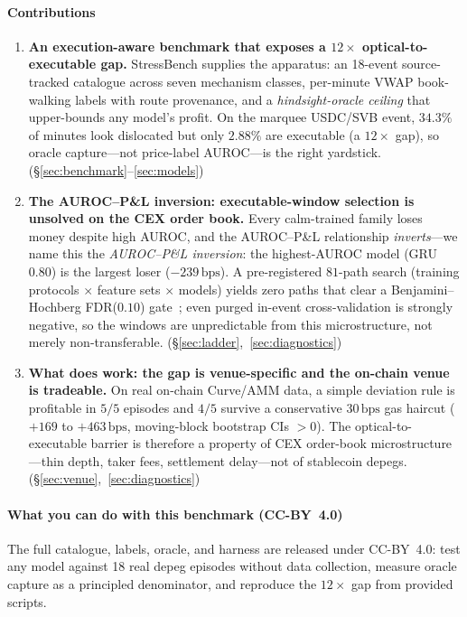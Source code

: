 \documentclass[sigconf,anonymous,natbib=false]{acmart}
\newcommand{\bps}{\,\text{bps}}
\begin{document}
\paragraph{Contributions}
\begin{enumerate}[leftmargin=*,itemsep=2pt,topsep=2pt]
  \item \textbf{An execution-aware benchmark that exposes a $12\times$ optical-to-executable gap.}
        StressBench supplies the apparatus: an 18-event source-tracked catalogue across seven
        mechanism classes, per-minute VWAP book-walking labels with route provenance, and a
        \emph{hindsight-oracle ceiling} that upper-bounds any model's profit. On the marquee
        USDC/SVB event, $34.3\%$ of minutes look dislocated but only $2.88\%$ are executable
        (a $12\times$ gap), so oracle capture---not price-label AUROC---is the right yardstick.
        (\S\ref{sec:benchmark}--\ref{sec:models})
  \item \textbf{The AUROC--P\&L inversion: executable-window selection is unsolved on the CEX order book.}
        Every calm-trained family loses money despite high AUROC, and the AUROC--P\&L relationship
        \emph{inverts}---we name this the \emph{AUROC--P\&L inversion}: the highest-AUROC model
        (GRU $0.80$) is the largest loser ($-239\bps$). A pre-registered
        $81$-path search (training protocols $\times$ feature sets $\times$ models) yields zero
        paths that clear a Benjamini--Hochberg FDR($0.10$) gate~\cite{benjamini1995fdr}; even
        purged in-event cross-validation is strongly negative, so the windows are unpredictable
        from this microstructure, not merely non-transferable. (\S\ref{sec:ladder},~\ref{sec:diagnostics})
  \item \textbf{What does work: the gap is venue-specific and the on-chain venue is tradeable.}
        On real on-chain Curve/AMM data, a simple deviation rule is profitable in $5/5$ episodes
        and $4/5$ survive a conservative $30\bps$ gas haircut ($+169$ to $+463\bps$, moving-block
        bootstrap CIs $>0$). The optical-to-executable barrier is therefore a property of CEX
        order-book microstructure---thin depth, taker fees, settlement delay---not of stablecoin
        depegs. (\S\ref{sec:venue},~\ref{sec:diagnostics})
\end{enumerate}

\paragraph{What you can do with this benchmark (CC-BY~4.0)}
The full catalogue, labels, oracle, and harness are released under CC-BY~4.0: test any
model against 18 real depeg episodes without data collection, measure oracle capture as a
principled denominator, and reproduce the $12\times$ gap from provided scripts.
\end{document}
